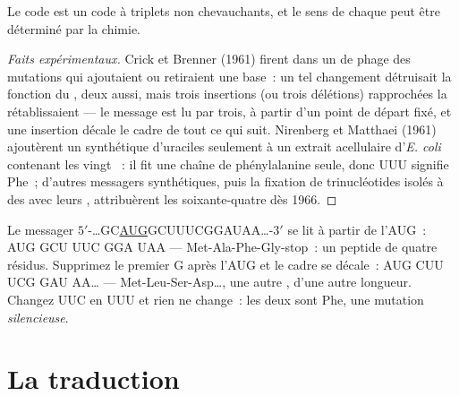 \begin{proposition}\label{prop:b1:gene-expression:nirenberg}
Le code est un code à triplets non chevauchants, et le sens de chaque
 peut être déterminé par la chimie.
\end{proposition}
\begin{proof}[Faits expérimentaux]
Crick et Brenner (1961) firent dans un  de phage des mutations qui
ajoutaient ou retiraient une base~: un tel changement détruisait la
fonction du , deux aussi, mais trois insertions (ou trois délétions)
rapprochées la rétablissaient --- le message est lu par trois, à partir
d'un point de départ fixé, et une insertion décale le cadre de tout ce
qui suit. Nirenberg et Matthaei (1961) ajoutèrent un  synthétique
d'uraciles seulement à un extrait acellulaire d'\emph{E. coli} contenant
les vingt ~: il fit une chaîne de phénylalanine seule, donc
UUU signifie Phe~; d'autres messagers synthétiques, puis la fixation de
trinucléotides isolés à des  avec leurs ,
attribuèrent les soixante-quatre  dès 1966.
\end{proof}

\begin{example}\label{ex:b1:gene-expression:reading}
Le messager $5'$-\ldots{}GC\underline{AUG}GCUUUCGGAUAA\ldots{}-$3'$ se
lit à partir de l'AUG~: AUG GCU UUC GGA UAA --- Met-Ala-Phe-Gly-stop~:
un peptide de quatre résidus. Supprimez le premier G après l'AUG et le
cadre se décale~: AUG CUU UCG GAU AA\ldots{} --- Met-Leu-Ser-Asp\ldots,
une autre , d'une autre longueur. Changez UUC en UUU et rien ne
change~: les deux sont Phe, une mutation \emph{silencieuse}.
\end{example}

\section{La traduction}

